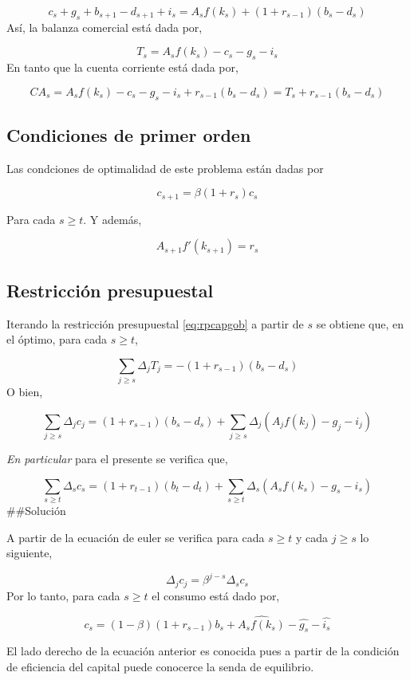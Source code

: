 \documentclass[]{article}
\begin{document}
\[
\begin{equation}
c_s + g_s + b_{s+1} - d_{s+1} + i_s = A_sf(k_s) + (1+r_{s-1})(b_s - d_s)
\label{eq:rpcapgob}
\end{equation}
\] Así, la balanza comercial está dada por,

\[
T_s = A_s f(k_s) - c_s - g_s - i_s
\] En tanto que la cuenta corriente está dada por,

\[
CA_s = A_sf(k_s) - c_s - g_s -i_s + r_{s-1}(b_s - d_s) = T_s + r_{s-1}(b_s - d_s)
\]

\subsection{Condiciones de primer
orden}\label{condiciones-de-primer-orden-3}

Las condciones de optimalidad de este problema están dadas por

\[
c_{s+1} = \beta(1+r_s)c_s
\]

Para cada \(s \geq t\). Y además,

\[
A_{s+1}f'(k_{s+1}) = r_s
\]

\subsection{Restricción presupuestal}\label{restriccion-presupuestal-3}

Iterando la restricción presupuestal \eqref{eq:rpcapgob} a partir de \(s\)
se obtiene que, en el óptimo, para cada \(s \geq t\),

\[
\sum_{j \geq s} \Delta_j T_j = -(1+ r_{s-1})(b_s-d_s)
\] O bien,

\[
\sum_{j \geq s} \Delta_j c_j = (1 + r_{s-1})(b_s - d_s) + \sum_{j \geq s}\Delta_j(A_j f(k_j) -g_j-i_j) 
\]

\emph{En particular} para el presente se verifica que,

\[
\sum_{s \geq t} \Delta_s c_s = (1 + r_{t-1})(b_t - d_t) + \sum_{s \geq t} \Delta_s (A_sf(k_s) - g_s - i_s)
\] \#\#Solución

A partir de la ecuación de euler se verifica para cada \(s \geq t\) y
cada \(j \geq s\) lo siguiente,

\[
\Delta_j c_j = \beta^{j-s}\Delta_sc_s
\] Por lo tanto, para cada \(s \geq t\) el consumo está dado por,

\[
c_s = (1-\beta)(1 + r_{s-1})b_s + \widehat{A_sf(k_s)} - \hat{g_s} - \hat{i_s}
\]

El lado derecho de la ecuación anterior es conocida pues a partir de la
condición de eficiencia del capital puede conocerce la senda de
equilibrio.
\end{document}
